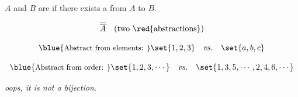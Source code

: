 
\begin{frame}{}
\end{frame}

\begin{frame}{}
  \begin{definition}[$|A| = |B| \;(A \approx B)$ (1878)]
    $A$ and $B$ are 
    if there exists a  from $A$ to $B$.
  \end{definition}

  \pause
  \[
    \overline{\overline{A}} \quad \text{(two \red{abstractions})}
  \]

  \pause
  \[
    \text{\blue{\small Abstract from elements: }} \set{1,2,3} \quad \text{\it vs.} \quad \set{a,b,c}
  \]

  \pause
  \[
    \text{\blue{\small Abstract from order: }} \set{1,2,3,\cdots} \quad \text{\it vs.} \quad \set{1,3,5,\cdots, 2,4,6,\cdots}
  \]
\end{frame}

\begin{frame}{}
  \begin{center}
    {\it \scriptsize oops, it is not a bijection.}
  \end{center}
\end{frame}




